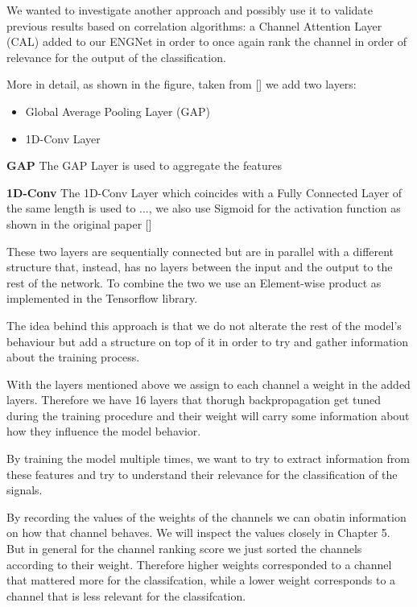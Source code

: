 \documentclass{Configuration_Files/PoliMi3i_thesis}
\begin{document}
We wanted to investigate another approach and possibly use it to validate previous results based on correlation algorithms: a Channel Attention Layer (CAL) added to our ENGNet in order to once again rank the channel in order of relevance for the output of the classification.

More in detail, as shown in the figure, taken from [] we add two layers:

\begin{itemize}
	\item Global Average Pooling Layer (GAP)
	\item 1D-Conv Layer
\end{itemize}

\textbf{GAP} \quad The GAP Layer is used to aggregate the features

\textbf{1D-Conv} \quad The 1D-Conv Layer which coincides with a Fully Connected Layer of the same length is used to ..., we also use Sigmoid for the activation function as shown in the original paper []

These two layers are sequentially connected but are in parallel with a different structure that, instead, has no layers between the input and the output to the rest of the network.
To combine the two we use an Element-wise product as implemented in the Tensorflow library.

The idea behind this approach is that we do not alterate the rest of the model's behaviour but add a structure on top of it in order to try and gather information about the training process.

With the layers mentioned above we assign to each channel a weight in the added layers.
Therefore we have 16 layers that thorugh backpropagation get tuned during the training procedure and their weight will carry some information about how they influence the model behavior.

By training the model multiple times, we want to try to extract information from these features and try to understand their relevance for the classification of the signals.

By recording the values of the weights of the channels we can obatin information on how that channel behaves.
We will inspect the values closely in Chapter 5.
But in general for the channel ranking score we just sorted the channels according to their weight.
Therefore higher weights corresponded to a channel that mattered more for the classifcation, while a lower weight corresponds to a channel that is less relevant for the classifcation.
\end{document}
